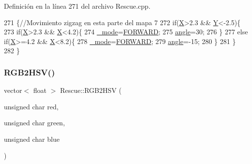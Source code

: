 Definición en la línea 271 del archivo Rescue.\+cpp.


\begin{DoxyCode}
271                        \{\textcolor{comment}{//Movimiento zigzag en esta parte del mapa 7}
272     \textcolor{keywordflow}{if}(\hyperlink{classRescue_ab2a4cd163b6619df49346383bb08d365_ab2a4cd163b6619df49346383bb08d365}{X}>2.3 && \hyperlink{classRescue_aefe62362f68d14dc3f9234791de23882_aefe62362f68d14dc3f9234791de23882}{Y}<-2.5)\{
273        \textcolor{keywordflow}{if}(\hyperlink{classRescue_ab2a4cd163b6619df49346383bb08d365_ab2a4cd163b6619df49346383bb08d365}{X}>2.3 && \hyperlink{classRescue_ab2a4cd163b6619df49346383bb08d365_ab2a4cd163b6619df49346383bb08d365}{X}<4.2)\{
274          \hyperlink{classRescue_a70a5e292c84029568ff6c0de2f2d9f43_a70a5e292c84029568ff6c0de2f2d9f43}{\_mode}=\hyperlink{classRescue_ab44ced9ce57b1b0d19b5456cd952d702_ab44ced9ce57b1b0d19b5456cd952d702ac5b8fd2a28d3d22c89095ccb90ea6e2a}{FORWARD};
275          \hyperlink{classRescue_a5bb8010f938dbe020a183b486772afe4_a5bb8010f938dbe020a183b486772afe4}{angle}=30;
276        \}
277        \textcolor{keywordflow}{else} \textcolor{keywordflow}{if}(\hyperlink{classRescue_ab2a4cd163b6619df49346383bb08d365_ab2a4cd163b6619df49346383bb08d365}{X}>=4.2 && \hyperlink{classRescue_ab2a4cd163b6619df49346383bb08d365_ab2a4cd163b6619df49346383bb08d365}{X}<8.2)\{
278          \hyperlink{classRescue_a70a5e292c84029568ff6c0de2f2d9f43_a70a5e292c84029568ff6c0de2f2d9f43}{\_mode}=\hyperlink{classRescue_ab44ced9ce57b1b0d19b5456cd952d702_ab44ced9ce57b1b0d19b5456cd952d702ac5b8fd2a28d3d22c89095ccb90ea6e2a}{FORWARD};
279          \hyperlink{classRescue_a5bb8010f938dbe020a183b486772afe4_a5bb8010f938dbe020a183b486772afe4}{angle}=-15;
280        \}
281     \}
282 \}
\end{DoxyCode}
\mbox{\label{classRescue_af2ba5b73069e7407f1bfc857a1ddae9c_af2ba5b73069e7407f1bfc857a1ddae9c}} 
\subsubsection{\texorpdfstring{R\+G\+B2\+H\+S\+V()}{RGB2HSV()}}
{\footnotesize\ttfamily vector$<$ float $>$ Rescue\+::\+R\+G\+B2\+H\+SV (\begin{DoxyParamCaption}\item[{unsigned char}]{red,  }\item[{unsigned char}]{green,  }\item[{unsigned char}]{blue }\end{DoxyParamCaption})}



